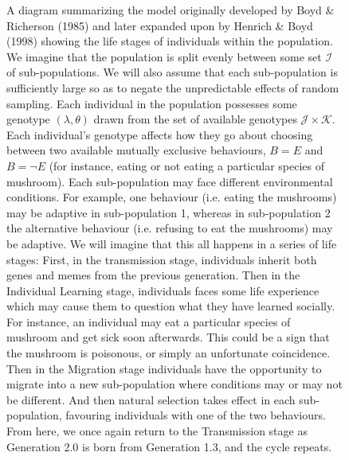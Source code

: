 \documentclass[a4paper,8pt]{extarticle}
\begin{document}
\begin{figure}
    \caption{A diagram summarizing the model originally developed by Boyd \& Richerson (1985) and later expanded upon by Henrich \& Boyd (1998) showing the life stages of individuals within the population. We imagine that the population is split evenly between some set $\mathcal I$ of sub-populations. We will also assume that each sub-population is sufficiently large so as to negate the unpredictable effects of random sampling. Each individual in the population possesses some genotype \mbox{$(\lambda,\theta)$} drawn from the set of available genotypes $\mathcal J \times \mathcal K$. Each individual's genotype affects how they go about choosing between two available mutually exclusive behaviours, $B=E$ and $B=\lnot E$ (for instance, eating or not eating a particular species of mushroom). Each sub-population may face different environmental conditions. For example, one behaviour (i.e. eating the mushrooms) may be adaptive in sub-population 1, whereas in sub-population 2 the alternative behaviour (i.e. refusing to eat the mushrooms) may be adaptive. We will imagine that this all happens in a series of life stages: First, in the transmission stage, individuals inherit both genes and memes from the previous generation. Then in the Individual Learning stage, individuals faces some life experience which may cause them to question what they have learned socially. For instance, an individual may eat a particular species of mushroom and get sick soon afterwards. This could be a sign that the mushroom is poisonous, or simply an unfortunate coincidence. Then in the Migration stage individuals have the opportunity to migrate into a new sub-population where conditions may or may not be different. And then natural selection takes effect in each sub-population, favouring individuals with one of the two behaviours. From here, we once again return to the Transmission stage as Generation 2.0 is born from Generation 1.3, and the cycle repeats. } 
    \label{fig:4.1}
\end{figure}
\end{document}
